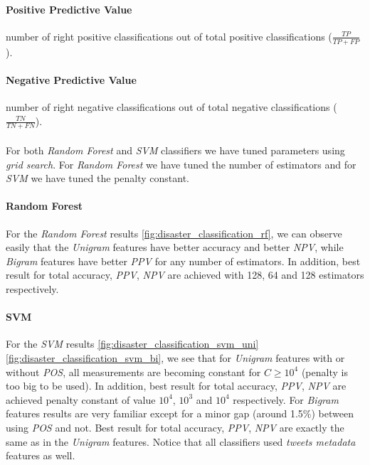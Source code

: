 \documentclass[letterpaper,twocolumn,10pt]{article}
\begin{document}
\paragraph{Positive Predictive Value} number of right positive classifications out of total positive classifications ($ \frac{TP}{TP + FP} $).
\paragraph{Negative Predictive Value} number of right negative classifications out of total negative classifications ($ \frac{TN}{TN + FN} $).
\\\\
For both \textit{Random Forest} and \textit{SVM} classifiers we have tuned parameters using \textit{grid search}. For \textit{Random Forest} we have tuned the number of estimators and for \textit{SVM} we have tuned the penalty constant. \\
\paragraph{Random Forest} For the \textit{Random Forest} results \ref{fig:disaster_classification_rf}, we can observe easily that the \textit{Unigram} features have better accuracy and better \textit{NPV}, while \textit{Bigram} features have better \textit{PPV} for any number of estimators. In addition, best result for total accuracy, \textit{PPV}, \textit{NPV} are achieved with 128, 64 and 128 estimators respectively.

\paragraph{SVM} For the \textit{SVM} results \ref{fig:disaster_classification_svm_uni} \ref{fig:disaster_classification_svm_bi}, we see that for \textit{Unigram} features with or without \textit{POS}, all measurements are becoming constant for $ C \ge 10^4 $ (penalty is too big to be used). In addition, best result for total accuracy, \textit{PPV}, \textit{NPV} are achieved penalty constant of value $ 10^4 $, $ 10^3 $  and $ 10^4 $ respectively. For \textit{Bigram} features results are very familiar except for a minor gap (around 1.5\%) between using \textit{POS} and not. Best result for total accuracy, \textit{PPV}, \textit{NPV} are exactly the same as in the \textit{Unigram} features. Notice that all classifiers used \textit{tweets metadata} features as well.
\end{document}
